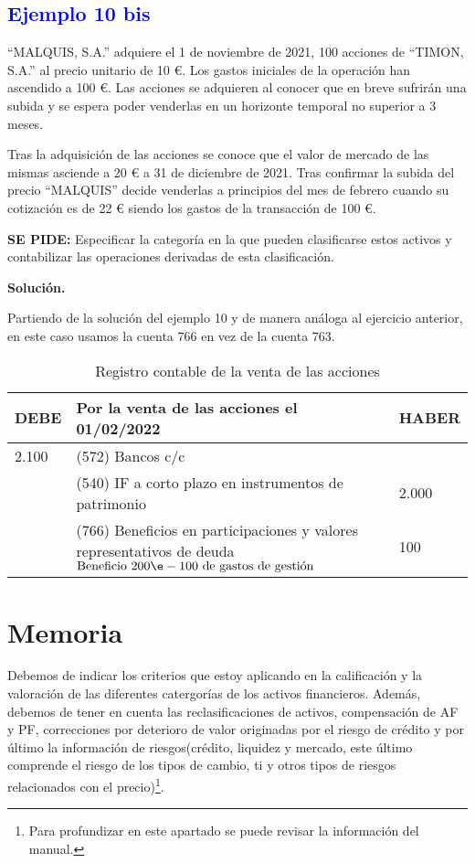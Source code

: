 \subsection*{\textcolor{blue}{Ejemplo 10 bis}}

``MALQUIS, S.A.'' adquiere el 1 de noviembre de 2021, 100 acciones de ``TIMON, S.A.'' al precio unitario de 10 €. Los gastos iniciales de la operación han ascendido a 100 €. Las acciones se adquieren al conocer que en breve sufrirán una subida y se espera poder venderlas en un horizonte temporal no superior a 3 meses.

Tras la adquisición de las acciones se conoce que el valor de mercado de las mismas asciende a 20 € a 31 de diciembre de 2021. Tras confirmar la subida del precio ``MALQUIS'' decide venderlas a principios del mes de febrero cuando su cotización es de 22 € siendo los gastos de la transacción de 100 €.

\textbf{SE PIDE:} Especificar la categoría en la que pueden clasificarse estos activos y contabilizar las operaciones derivadas de esta clasificación.

\textbf{Solución.}

Partiendo de la solución del ejemplo 10 y de manera análoga al ejercicio anterior, en este caso usamos la cuenta 766 en vez de la cuenta 763.

\begin{table}[H]
    \centering
    \begin{tabular}{|p{3cm}|p{6cm}|p{3cm}|}
    \hline
    \rowcolor{blue!30}
    \textbf{DEBE} & \textbf{Por la venta de las acciones el 01/02/2022} & \textbf{HABER} \\
    \hline
    2.100 & (572) Bancos c/c & \\
    \hline
    & (540) IF a corto plazo en instrumentos de patrimonio & 2.000 \\
    \hline
    & (766) Beneficios en participaciones y valores representativos de deuda $\text{Beneficio 200} \e - 100 \text{ de gastos de } \text{gestión}$& 100 \\
    \hline
    \end{tabular}
    \caption{Registro contable de la venta de las acciones}
    \label{tabla:venta_acciones}
\end{table}
\newpage
\section{Memoria}

Debemos de indicar los criterios que estoy aplicando en la calificación y la valoración de las diferentes catergorías de los activos financieros. 
Además, debemos de tener en cuenta las reclasificaciones de activos, compensación de AF y PF, correcciones por deterioro de valor originadas por el riesgo de crédito y por último la información de riesgos(crédito, liquidez y mercado, este último comprende el riesgo de los tipos de cambio, ti y otros tipos de riesgos relacionados con el precio)\footnote{Para profundizar en este apartado se puede revisar la información del manual.}.

